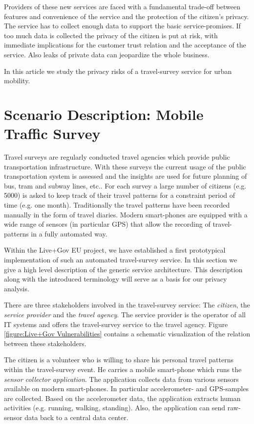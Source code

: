 \documentclass[runningheads,a4paper]{llncs}
\begin{document}
Providers of these new services are faced with a fundamental trade-off
between features and convenience of the service and the protection of
the citizen's privacy. The service has to collect enough data to
support the basic service-promises. If too much data is collected the
privacy of the citizen is put at risk, with immediate implications for
the customer trust relation and the acceptance of the service. Also
leaks of private data can jeopardize the whole business.

In this article we study the privacy risks of a travel-survey service
for urban mobility.


\section{Scenario Description: Mobile Traffic Survey}
\label{sec:ScenarioDescription}

Travel surveys are regularly conducted travel agencies which provide
public transportation infrastructure. With these surveys the current
usage of the public transportation system is assessed and the insights
are used for future planning of bus, tram and subway lines, etc..  For
each survey a large number of citizens (e.g. 5000) is asked to keep
track of their travel patterns for a constraint period of time
(e.g. one month). Traditionally the travel patterns have been recorded
manually in the form of travel diaries. Modern smart-phones are
equipped with a wide range of sensors (in particular GPS) that allow
the recording of travel-patterns in a fully automated way.

Within the Live+Gov EU project, we have established a first
prototypical implementation of such an automated travel-survey
service. In this section we give a high level description of the
generic service architecture. This description along with the
introduced terminology will serve as a basis for our privacy analysis.

There are three stakeholders involved in the travel-survey service:
The \emph{citizen}, the \emph{service provider} and the \emph{travel
  agency}. The service provider is the operator of all IT systems and
offers the travel-survey service to the travel agency. Figure
\ref{figure:Live+Gov Vulnerabilities} contains a schematic
visualization of the relation between these stakeholders.

The citizen is a volunteer who is willing to share his personal travel
patterns within the travel-survey event.  He carries a mobile
smart-phone which runs the \emph{sensor collector application}. The
application collects data from various sensors available on modern
smart-phones. In particular accelerometer- and GPS-samples are
collected. Based on the accelerometer data, the application extracts
human activities (e.g. running, walking, standing). Also, the
application can send raw-sensor data back to a central data center.
\end{document}
